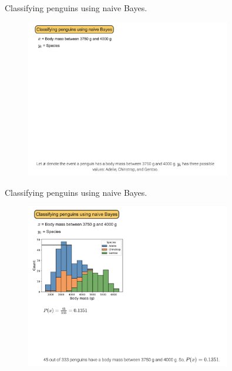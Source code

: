 \documentclass[10pt,dvipsnames]{beamer}
\begin{document}
\begin{frame}{Classifying penguins using naive Bayes.}
	    \begin{figure}[ht]
		\centering
		\includegraphics[width=0.8\textwidth]{imgs/nb_8.png}
	\end{figure}
\end{frame}

\begin{frame}{Classifying penguins using naive Bayes.}
	\begin{figure}[ht]
		\centering
		\includegraphics[width=0.8\textwidth]{imgs/nb_9.png}
	\end{figure}
\end{frame}
\end{document}
